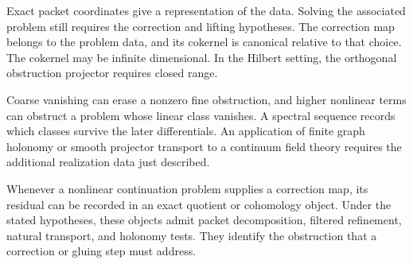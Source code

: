 Exact packet coordinates give a representation of the data. Solving the associated problem still requires the correction and lifting hypotheses. The correction map belongs to the problem data, and its cokernel is canonical relative to that choice. The cokernel may be infinite dimensional. In the Hilbert setting, the orthogonal obstruction projector requires closed range.

Coarse vanishing can erase a nonzero fine obstruction, and higher nonlinear terms can obstruct a problem whose linear class vanishes. A spectral sequence records which classes survive the later differentials. An application of finite graph holonomy or smooth projector transport to a continuum field theory requires the additional realization data just described.

Whenever a nonlinear continuation problem supplies a correction map, its residual can be recorded in an exact quotient or cohomology object. Under the stated hypotheses, these objects admit packet decomposition, filtered refinement, natural transport, and holonomy tests. They identify the obstruction that a correction or gluing step must address.
